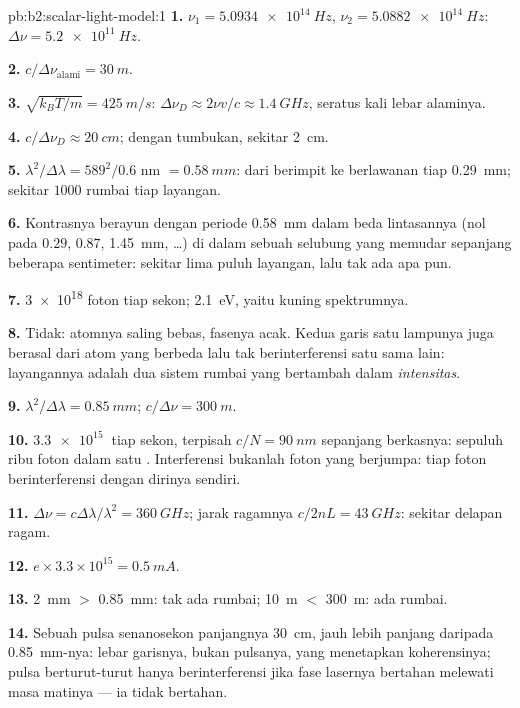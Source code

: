 \begin{solution}{pb:b2:scalar-light-model:1}
\textbf{1.} $\nu_1 = \qty{5.0934e14}{Hz}$, $\nu_2 = \qty{5.0882e14}{Hz}$: $\Delta\nu = \qty{5.2e11}{Hz}$.

\textbf{2.} $c/\Delta\nu_{\text{alami}} = \qty{30}{m}$.

\textbf{3.} $\sqrt{k_BT/m} = \qty{425}{m/s}$: $\Delta\nu_D \approx 2\nu v/c \approx \qty{1.4}{GHz}$, seratus
kali lebar alaminya.

\textbf{4.} $c/\Delta\nu_D \approx \qty{20}{cm}$; dengan tumbukan, sekitar \qty{2}{cm}.

\textbf{5.} $\lambda^2/\Delta\lambda = 589^2/0.6$ nm $= \qty{0.58}{mm}$: dari berimpit ke
berlawanan tiap \qty{0.29}{mm}; sekitar $1000$ rumbai tiap layangan.

\textbf{6.} Kontrasnya berayun dengan periode \qty{0.58}{mm} dalam beda
lintasannya (nol pada $0.29$, $0.87$, \qty{1.45}{mm}, \dots) di dalam sebuah selubung
yang memudar sepanjang beberapa sentimeter: sekitar lima puluh layangan, lalu tak ada apa pun.

\textbf{7.} \qty{3e18}{} foton tiap sekon; \qty{2.1}{eV}, yaitu kuning
spektrumnya.

\textbf{8.} Tidak: atomnya saling bebas, fasenya acak. Kedua garis satu
lampunya juga berasal dari atom yang berbeda lalu tak berinterferensi satu sama
lain: layangannya adalah dua sistem rumbai yang bertambah dalam \emph{intensitas}.

\textbf{9.} $\lambda^2/\Delta\lambda = \qty{0.85}{mm}$; $c/\Delta\nu = \qty{300}{m}$.

\textbf{10.} $\qty{3.3e15}{}$ tiap sekon, terpisah $c/N = \qty{90}{nm}$ sepanjang berkasnya:
sepuluh ribu foton dalam satu . Interferensi bukanlah
foton yang berjumpa: tiap foton berinterferensi dengan dirinya sendiri.

\textbf{11.} $\Delta\nu = c\Delta\lambda/\lambda^2 = \qty{360}{GHz}$; jarak ragamnya $c/2nL = \qty{43}{GHz}$:
sekitar delapan ragam.

\textbf{12.} $e \times 3.3 \times 10^{15} = \qty{0.5}{mA}$.

\textbf{13.} \qty{2}{mm} $>$ \qty{0.85}{mm}: tak ada rumbai; \qty{10}{m} $<$ \qty{300}{m}: ada rumbai.

\textbf{14.} Sebuah pulsa senanosekon panjangnya \qty{30}{cm}, jauh lebih panjang daripada
 \qty{0.85}{mm}-nya: lebar garisnya, bukan pulsanya, yang menetapkan
koherensinya; pulsa berturut-turut hanya berinterferensi jika fase lasernya
bertahan melewati masa matinya --- ia tidak bertahan.


\end{solution}
